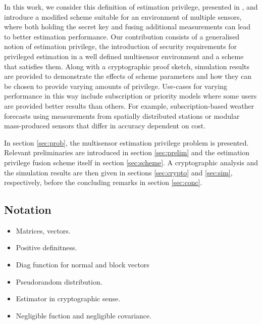 \documentclass[conference]{IEEEtran}
\begin{document}
In this work, we consider this definition of estimation privilege, presented in \cite{risticCryptographicallyPrivilegedState2022}, and introduce a modified scheme suitable for an environment of multiple sensors, where both holding the secret key and fusing additional measurements can lead to better estimation performance. Our contribution consists of a generalised notion of estimation privilege, the introduction of security requirements for privileged estimation in a well defined multisensor environment and a scheme that satisfies them. Along with a cryptographic proof sketch, simulation results are provided to demonstrate the effects of scheme parameters and how they can be chosen to provide varying amounts of privilege. Use-cases for varying performance in this way include subscription or priority models where some users are provided better results than others. For example, subscription-based weather forecasts using measurements from spatially distributed stations or modular mass-produced sensors that differ in accuracy dependent on cost.

In section \ref{sec:prob}, the multisensor estimation privilege problem is presented. Relevant preliminaries are introduced in section \ref{sec:prelim} and the estimation privilege fusion scheme itself in section \ref{sec:scheme}. A cryptographic analysis and the simulation results are then given in sections \ref{sec:crypto} and \ref{sec:sim}, respectively, before the concluding remarks in section \ref{sec:conc}.

\subsection{Notation}\label{subsec:notation}
\begin{itemize}
  \item Matrices, vectors.
  \item Positive definitness.
  \item Diag function for normal and block vectors
  \item Pseudorandom distribution.
  \item Estimator in cryptographic sense.
  \item Negligible fuction and negligible covariance.
\end{itemize}

% 
%                                              
%                                              
%                                              
% 
\end{document}
